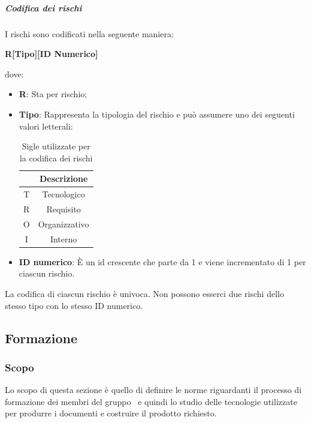       \subparagraph {Codifica dei rischi}
     I rischi sono codificati nella seguente maniera: \\
     \begin{center}
      \textbf{\Large{R[Tipo][ID Numerico]}}
    \end{center}
    dove:
    \begin{itemize}[label={}]
      \item \textbf{R}: Sta per rischio;
      \item \textbf{Tipo}: Rappresenta la tipologia del rischio e può assumere uno dei seguenti valori letterali:
      \begin{table}[H]
        \centering
        \renewcommand{\arraystretch}{1.8}
        \begin{tabular}{c|c}
          \rowcolor[HTML]{125E28} 
          \multicolumn{1}{c}{\color[HTML]{FFFFFF}\textbf{Sigla}}
          & \multicolumn{1}{c}{\color[HTML]{FFFFFF}\textbf{Descrizione}}\\
          \hline
          T & Tecnologico\\
          R & Requisito\\
          O & Organizzativo\\
          I & Interno\\
        \end{tabular}
        \caption{Sigle utilizzate per la codifica dei rischi}
      \end{table} 
      \item \textbf{ID numerico}: È un id crescente che parte da 1 e viene incrementato di 1 per ciascun rischio.\\
    \end{itemize}
    La codifica di ciascun rischio è univoca. Non possono esserci due rischi dello stesso tipo con lo stesso ID numerico.
        \subsection{Formazione} \label{subsection: formazione}
        \subsubsection {Scopo}
        Lo scopo di questa sezione è quello di definire le norme riguardanti il processo di formazione dei membri del gruppo \groupName\ e quindi lo studio delle tecnologie utilizzate per produrre i documenti e costruire il prodotto richiesto.
